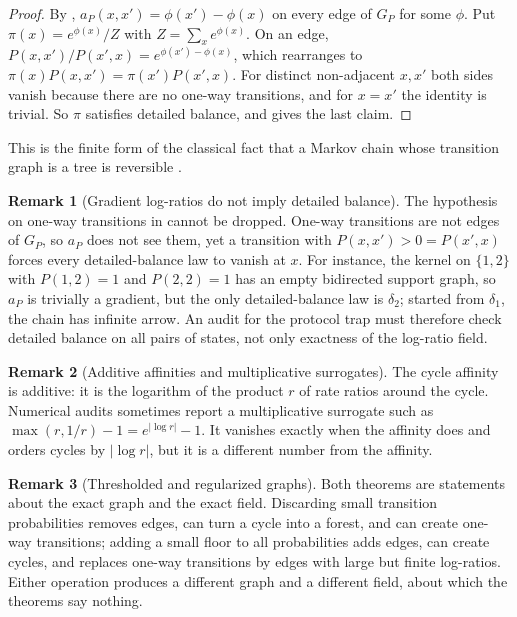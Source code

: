 \documentclass[11pt]{article}
\theoremstyle{definition}
\newtheorem{remark}{Remark}[section]
\newcommand{\1}{\mathbf{1}}
\newcommand{\thmNGProtocolTrap}{\Cref{thm:NG_PROTOCOL_TRAP}}
\newcommand{\thmNGForceForest}{\Cref{thm:NG_FORCE_FOREST}}
\begin{document}
\begin{proof}
By \thmNGForceForest, $a_P(x,x')=\phi(x')-\phi(x)$ on every edge of $G_P$ for some $\phi$.
Put $\pi(x)=e^{\phi(x)}/Z$ with $Z=\sum_{x}e^{\phi(x)}$.
On an edge, $P(x,x')/P(x',x)=e^{\phi(x')-\phi(x)}$, which rearranges to $\pi(x)P(x,x')=\pi(x')P(x',x)$.
For distinct non-adjacent $x,x'$ both sides vanish because there are no one-way transitions, and for $x=x'$ the identity is trivial.
So $\pi$ satisfies detailed balance, and \thmNGProtocolTrap{} gives the last claim.
\end{proof}

This is the finite form of the classical fact that a Markov chain whose transition graph is a tree is reversible \citep{Kelly1979}.

\begin{remark}[Gradient log-ratios do not imply detailed balance]\label{rem:one_way}
The hypothesis on one-way transitions in  cannot be dropped.
One-way transitions are not edges of $G_P$, so $a_P$ does not see them, yet a transition with $P(x,x')>0=P(x',x)$ forces every detailed-balance law to vanish at $x$.
For instance, the kernel on $\{1,2\}$ with $P(1,2)=1$ and $P(2,2)=1$ has an empty bidirected support graph, so $a_P$ is trivially a gradient, but the only detailed-balance law is $\delta_2$; started from $\delta_1$, the chain has infinite arrow.
An audit for the protocol trap must therefore check detailed balance on all pairs of states, not only exactness of the log-ratio field.
\end{remark}

\begin{remark}[Additive affinities and multiplicative surrogates]
The cycle affinity is additive: it is the logarithm of the product $r$ of rate ratios around the cycle.
Numerical audits sometimes report a multiplicative surrogate such as $\max(r,1/r)-1=e^{|\log r|}-1$.
It vanishes exactly when the affinity does and orders cycles by $|\log r|$, but it is a different number from the affinity.
\end{remark}

\begin{remark}[Thresholded and regularized graphs]
Both theorems are statements about the exact graph and the exact field.
Discarding small transition probabilities removes edges, can turn a cycle into a forest, and can create one-way transitions; adding a small floor to all probabilities adds edges, can create cycles, and replaces one-way transitions by edges with large but finite log-ratios.
Either operation produces a different graph and a different field, about which the theorems say nothing.
\end{remark}
\end{document}
